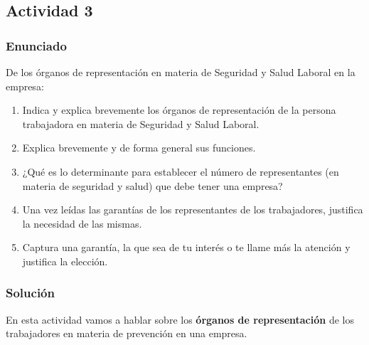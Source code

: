 \subsection{Actividad 3}
\subsubsection{Enunciado}
De los órganos de representación en materia de Seguridad y Salud Laboral en la empresa:

\begin{enumerate}[label=\alph*.]
    \item Indica y explica brevemente los órganos de representación de la persona trabajadora en materia de Seguridad y Salud Laboral.
    \item Explica brevemente y de forma general sus funciones.
    \item ¿Qué es lo determinante para establecer el número de representantes (en materia de seguridad y salud) que debe tener una empresa?
    \item Una vez leídas las garantías de los  representantes de los trabajadores, justifica la necesidad de las mismas.
    \item Captura una garantía, la que sea de tu interés o te llame más la atención y justifica la elección.
\end{enumerate}

\subsubsection{Solución}
En esta actividad vamos a hablar sobre los \textbf{órganos de representación} de los trabajadores en materia de prevención en una empresa.

